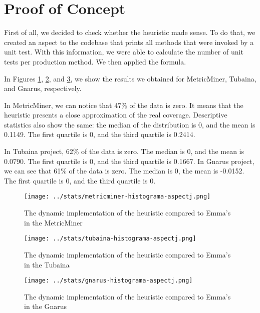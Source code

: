 \documentclass{sig-alternate}
\begin{document}
\section{Proof of Concept}
\label{poc}

First of all, we decided to check whether the heuristic made sense. To do that, we 
created an aspect to the codebase that prints all methods that were invoked by a unit test. 
With this information, we were able to calculate the number of unit tests per production method. 
We then applied the formula. 

In Figures \ref{fig:metricminer-aj}, \ref{fig:tubaina-aj}, and
\ref{fig:gnarus-aj}, we show the results we obtained for MetricMiner, Tubaina, and Gnarus, respectively. 

In MetricMiner, we can notice that 47\% of the data is zero. It means that the heuristic
presents a close approximation of the real coverage. Descriptive statistics also show the same: 
the median of the distribution is 0, and the mean is 0.1149. The first quartile is 0, and the
third quartile is 0.2414.

In Tubaina project, 62\% of the data is zero. The median is 0, and the mean is 0.0790. The first quartile is
0, and the third quartile is 0.1667. 
In Gnarus project, we can see that 61\% of the data is zero. The median is 0, the mean is -0.0152. The first quartile
is 0, and the third quartile is 0.

\begin{figure}[h!H]
  \centering
  \texttt{[image: ../stats/metricminer-histograma-aspectj.png]}
  \caption{The dynamic implementation of the heuristic compared to Emma's in the MetricMiner}
  \label{fig:metricminer-aj}
\end{figure}

\begin{figure}[h!H]
  \centering
  \texttt{[image: ../stats/tubaina-histograma-aspectj.png]}
  \caption{The dynamic implementation of the heuristic compared to Emma's in the Tubaina}
  \label{fig:tubaina-aj}
\end{figure}

\begin{figure}[h!H]
  \centering
  \texttt{[image: ../stats/gnarus-histograma-aspectj.png]}
  \caption{The dynamic implementation of the heuristic compared to Emma's in the Gnarus}
  \label{fig:gnarus-aj}
\end{figure}
\end{document}
